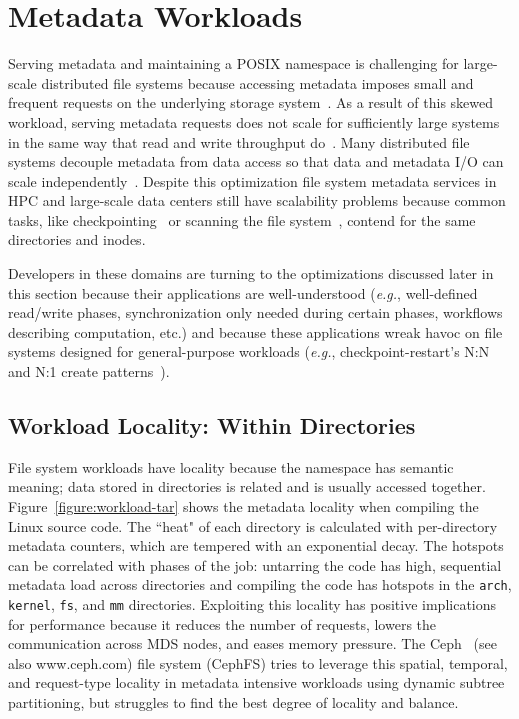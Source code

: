 \section{Metadata Workloads}
Serving metadata and maintaining a POSIX namespace is challenging for
large-scale distributed file systems because accessing metadata imposes small
and frequent requests on the underlying storage
system~\cite{roselli:atec2000-FS-workloads}. As a result of this skewed
workload, serving metadata requests does not scale for sufficiently large
systems in the same way that read and write throughput
do~\cite{abad:ucc2012-mimesis, alam:pdsw2011-metadata-scaling,
weil:osdi2006-ceph}. Many distributed file systems decouple metadata from data
access so that data and metadata I/O can scale
independently~\cite{alam:pdsw2011-metadata-scaling, ghemawat:sosp2003-gfs,
hildebrand:msst2005-pnfs,weil:osdi2006-ceph,welch:fast2008-panasas,xing:sc2009-skyfs}.
Despite this optimization file system metadata services in HPC and large-scale
data centers still have scalability problems because common tasks, like
checkpointing~\cite{bent_plfs_2009} or scanning the file
system~\cite{zheng:pdsw2014-batchfs}, contend for the same directories and
inodes.

Developers in these domains are turning to the optimizations discussed later in
this section because their applications are well-understood ({\it e.g.},
well-defined read/write phases, synchronization only needed during certain
phases, workflows describing computation, etc.) and because these applications
wreak havoc on file systems designed for general-purpose workloads ({\it e.g.},
checkpoint-restart's N:N and N:1 create patterns~\cite{bent_plfs_2009}).

\subsection{Workload Locality: Within Directories}

File system workloads have locality because the namespace has semantic meaning;
data stored in directories is related and is usually accessed together.
Figure~\ref{figure:workload-tar} shows the metadata locality when compiling the
Linux source code. The ``heat" of each directory is calculated with
per-directory metadata counters, which are tempered with an exponential decay.
The hotspots can be correlated with phases of the job: untarring the code has
high, sequential metadata load across directories and compiling the code has
hotspots in the \texttt{arch}, \texttt{kernel}, \texttt{fs}, and \texttt{mm}
directories. Exploiting this locality has positive implications for performance
because it reduces the number of requests, lowers the communication across MDS
nodes, and eases memory pressure. The Ceph~\cite{weil:osdi2006-ceph} (see also
www.ceph.com) file system (CephFS) tries to leverage this spatial, temporal,
and request-type locality in metadata intensive workloads using dynamic subtree
partitioning, but struggles to find the best degree of locality and balance.

